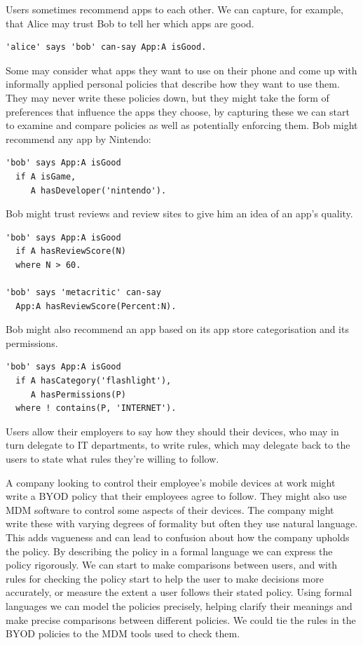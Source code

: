\documentclass[thesis.tex]{subfiles}
\begin{document}
Users sometimes recommend apps to each other. We can capture, for example, that
Alice may trust Bob to tell her which apps are good.
%
\begin{lstlisting}
'alice' says 'bob' can-say App:A isGood.
\end{lstlisting}
%
Some may consider what apps they want to use on their phone and come up with
informally applied personal policies that describe how they want to use them.
They may never write these policies down, but they might take the form of
preferences that influence the apps they choose, by capturing these we can start
to examine and compare policies as well as potentially enforcing them. Bob might recommend any app by Nintendo:
%
\begin{lstlisting}
'bob' says App:A isGood
  if A isGame,
     A hasDeveloper('nintendo').
\end{lstlisting}
%
Bob might trust reviews and review sites to give him an idea of an app's quality. 
%
\begin{lstlisting}
'bob' says App:A isGood
  if A hasReviewScore(N)
  where N > 60.
 
'bob' says 'metacritic' can-say
  App:A hasReviewScore(Percent:N).
\end{lstlisting}

\pagebreak
Bob might also recommend an app based on its app store categorisation and its permissions.
%
\begin{lstlisting}
'bob' says App:A isGood
  if A hasCategory('flashlight'),
     A hasPermissions(P)
  where ! contains(P, 'INTERNET').
\end{lstlisting}

Users allow their employers to say how they should their devices, who
may in turn delegate to IT departments, to write rules, which may
delegate back to the users to state what rules they're willing to
follow.

A company looking to control their employee's mobile devices at work
might write a \ac{BYOD} policy that their employees agree to
follow. They might also use \ac{MDM} software to control some aspects
of their devices. The company might write these with varying degrees
of formality but often they use natural language. This adds vagueness
and can lead to confusion about how the company upholds the policy. By
describing the policy in a formal language we can express the policy
rigorously. We can start to make comparisons between users, and with
rules for checking the policy start to help the user to make decisions
more accurately, or measure the extent a user follows their stated
policy. Using formal languages we can model the policies precisely,
helping clarify their meanings and make precise comparisons between
different policies. We could tie the rules in the \ac{BYOD} policies
to the \ac{MDM} tools used to check them.
\end{document}
